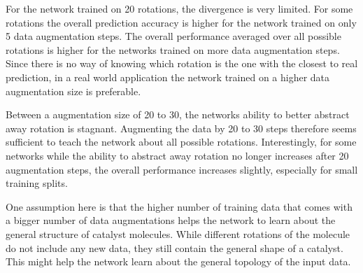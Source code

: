 For the network trained on 20 rotations, the divergence is very limited.
For some rotations the overall prediction accuracy is higher for the network trained on only 5 data augmentation steps.
The overall performance averaged over all possible rotations is higher for the networks trained on more data augmentation steps.
Since there is no way of knowing which rotation is the one with the closest to real prediction, in 
a real world application the network trained on a higher data augmentation size is preferable.

Between a augmentation size of 20 to 30, the networks ability to better abstract away rotation is stagnant.
Augmenting the data by 20 to 30 steps therefore seems sufficient to teach the network about all possible rotations.
Interestingly, for some networks while the ability to abstract away rotation no longer increases after 20 augmentation 
steps, the overall performance increases slightly, especially for small training splits.

One assumption here is that the higher number of training data that comes with a bigger number of data augmentations
helps the network to learn about the general structure of catalyst molecules.
While different rotations of the molecule do not include any new data, they still contain the 
general shape of a catalyst.
This might help the network learn about the general topology of the input data.

